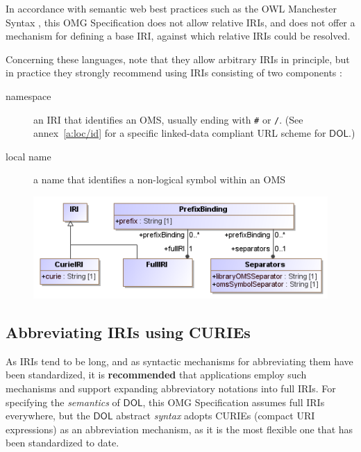 \documentclass[10pt,fleqn,final]{scrreprt}
\newcommand*{\syntax}[1]{\texttt{#1}}
\newcommand*{\recommended}{\textbf{recommended}\xspace}
\newcommand*{\IS}{OMG Specification\xspace}
\newcommand*{\DOL}{\ensuremath{\mathsf{DOL}}\xspace}
\newcommand{\ssclause}[1]{\subsection{#1}}
\providecommand{\DIFadd}[1]{{\protect\color{blue}\uwave{#1}}} %
\providecommand{\DIFaddbegin}{} %
\providecommand{\DIFaddend}{} %
\providecommand{\DIFdelbegin}{} %
\providecommand{\DIFdelend}{} %
\providecommand{\DIFaddFL}[1]{\DIFadd{#1}} %
\providecommand{\DIFaddbeginFL}{} %
\providecommand{\DIFaddendFL}{} %
\providecommand{\DIFdelbeginFL}{} %
\providecommand{\DIFdelendFL}{} %
\begin{document}
In accordance with semantic web best practices such as the OWL Manchester Syntax 
\cite{W3C:NOTE-owl2-manchester-syntax-20091027}, this \IS does not allow relative IRIs, and does 
not offer a mechanism for defining a base IRI, against which relative IRIs could be resolved.

Concerning these languages, note that they allow arbitrary IRIs in principle, but in practice they 
strongly recommend using IRIs consisting of two components \cite{W3C:NOTE-swbp-vocab-pub-20080828}:
\begin{description}
\item[namespace] an IRI that identifies an OMS,
usually ending with \syntax{\#} or \syntax{/}. ({See annex~\ref{a:loc/id} for a specific linked-data compliant URL scheme for \DOL.})
\item[local name] a name that identifies a non-logical symbol within an OMS
\end{description}

\medskip
\DIFdelbegin %
\DIFdelend \DIFaddbegin \begin{figure}
  \centering
    \DIFaddendFL \includegraphics[scale=0.47]{mof/prefixes.png}
  \DIFdelbeginFL %
\DIFdelendFL \DIFaddbeginFL \caption{\DIFaddFL{DOL metamodel: Prefixes}}
  \label{fig:prefixes}
\end{figure}
\DIFaddend 



%
\ssclause{Abbreviating IRIs using CURIEs}\label{c:curies}

As IRIs tend to be long, and as syntactic mechanisms for abbreviating them have been standardized, 
it is \recommended that applications employ such mechanisms and support expanding abbreviatory
notations into full IRIs.  For specifying the \emph{semantics} of \DOL, this \IS assumes full IRIs 
everywhere, but the \DOL abstract \emph{syntax} adopts CURIEs (compact URI expressions) as an 
abbreviation mechanism, as it is the most flexible one that has been standardized to date.  
\end{document}
